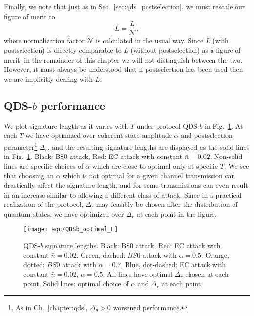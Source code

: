 \noindent Finally, we note that just as in Sec.~\ref{sec:qds_postselection}, we must rescale our figure of merit to
\begin{equation}
\tilde{L} = \frac{L}{\mathcal{N}},
\end{equation}
where normalization factor $\mathcal{N}$ is calculated in the usual way. Since $\tilde{L}$ (with postselection) is directly comparable to $L$ (without postselection) as a figure of merit, in the remainder of this chapter we will not distinguish between the two. However, it must always be understood that if postselection has been used then we are implicitly dealing with $\tilde{L}$.





\subsection{QDS-$b$ performance}

We plot signature length as it varies with $T$ under protocol QDS-$b$ in Fig.~\ref{fig:aqc_qdsb_lengths}. At each $T$ we have optimized over coherent state amplitude $\alpha$ and postselection parameter\footnote{As in Ch.~\ref{chapter:qds}, $\Delta_\theta>0$ worsened performance.} $\Delta_r$, and the resulting signature lengths are displayed as the solid lines in Fig.~\ref{fig:aqc_qdsb_lengths}. Black: BS$0$ attack, Red: EC attack with constant $\bar{n}=0.02$. Non-solid lines are specific choices of $\alpha$ which are close to optimal only at specific $T$. We see that choosing an $\alpha$ which is not optimal for a given channel transmission can drastically affect the signature length, and for some transmissions can even result in an increase similar to allowing a different class of attack. Since in a practical realization of the protocol, $\Delta_r$ may feasibly be chosen after the distribution of quantum states, we have optimized over $\Delta_r$ at each point in the figure.

\begin{figure}[htp]
\captionsetup{width=0.8\linewidth}
\centering
\texttt{[image: aqc/QDSb\_optimal\_L]}
\caption{\label{fig:aqc_qdsb_lengths} QDS-$b$ signature lengths. Black: BS$0$ attack. Red: EC attack with constant $\bar{n} = 0.02$. Green, dashed: $BS0$ attack with $\alpha=0.5$. Orange, dotted: $BS0$ attack with $\alpha=0.7$, Blue, dot-dashed: EC attack with constant $\bar{n}=0.02$, $\alpha=0.5$. All lines have optimal $\Delta_r$ chosen at each point. Solid lines: optimal choice of $\alpha$ and $\Delta_r$ at each point.}
\end{figure}

